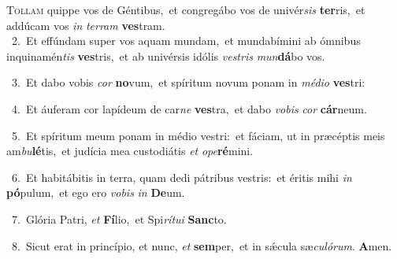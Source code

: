 \lettrine{\initial\textcolor{\initialcolor}{T}}{ollam} quippe vos de Géntibus,~\dagger et congregábo vos de univér\textit{sis} \textbf{ter}\-ris,~\star et addúcam vos \textit{in} \textit{ter}\-\textit{ram} \textbf{ves}\-tram.\\
{\numbfont\textcolor{\numbcolor}{~2.}}~Et effúndam super vos aquam mundam,~\dagger et mundabímini ab ómnibus inquinamén\textit{tis} \textbf{ves}\-tris,~\star et ab univérsis idólis \textit{ves}\-\textit{tris} \textit{mun}\-\textbf{dá}bo vos.\par
{\numbfont\textcolor{\numbcolor}{~3.}}~Et dabo vobis \textit{cor} \textbf{no}\-vum,~\star et spíritum novum ponam in \textit{mé}\-\textit{di}\textit{o} \textbf{ves}\-tri:\par
{\numbfont\textcolor{\numbcolor}{~4.}}~Et áuferam cor lapídeum de car\textit{ne} \textbf{ves}\-tra,~\star et dabo \textit{vo}\-\textit{bis} \textit{cor} \textbf{cár}\-neum.\par
{\numbfont\textcolor{\numbcolor}{~5.}}~Et spíritum meum ponam in médio vestri:~\dagger et fáciam, ut in præcéptis meis am\-\textit{bu}\-\textbf{lé}tis,~\star et judícia mea custodiátis \textit{et} \textit{o}\-\textit{pe}\textbf{ré}mini.\par
{\numbfont\textcolor{\numbcolor}{~6.}}~Et habitábitis in terra, quam dedi pátribus vestris:~\dagger et éritis mihi \textit{in} \textbf{pó}\-pulum,~\star et ego ero \textit{vo}\-\textit{bis} \textit{in} \textbf{De}\-um.\par
{\numbfont\textcolor{\numbcolor}{~7.}}~Glória Patri, \textit{et} \textbf{Fí}\-lio,~\star et Spi\-\textit{rí}\-\textit{tu}\textit{i} \textbf{Sanc}\-to.\par
{\numbfont\textcolor{\numbcolor}{~8.}}~Sicut erat in princípio, et nunc, \textit{et} \textbf{sem}\-per,~\star et in sǽcula sæ\-\textit{cu}\-\textit{ló}\textit{rum}. \textbf{A}\-men.\par
